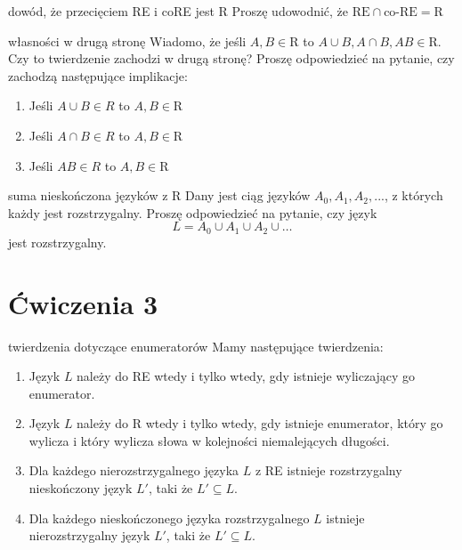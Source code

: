 \begin{exercise}{dowód, że przecięciem RE i coRE jest R}
    Proszę udowodnić, że $\text{RE} \cap \text{co-RE} = \text{R}$
\end{exercise}

\begin{exercise}{własności w drugą stronę}
    Wiadomo, że jeśli $A, B \in \text{R}$ to $A \cup B, A \cap B, AB \in \text{R}$. Czy to twierdzenie zachodzi w drugą stronę? Proszę odpowiedzieć na pytanie, czy zachodzą następujące implikacje:
\begin{enumerate}
    \item Jeśli $A \cup B \in R$ to $A,B \in \text{R}$
    \item Jeśli $A \cap B \in R$ to $A,B \in \text{R}$
    \item Jeśli $AB \in R$ to $A,B \in \text{R}$
\end{enumerate}
\end{exercise}
\begin{exercise}{suma nieskończona języków z R}
    Dany jest ciąg języków $A_0,A_1,A_2,...$, z których każdy jest rozstrzygalny. Proszę odpowiedzieć na pytanie, czy język
    $$L = A_0 \cup A_1 \cup A_2 \cup \dots$$
jest rozstrzygalny.
\end{exercise}

\section{Ćwiczenia 3}

\begin{exercise}{twierdzenia dotyczące enumeratorów}
    Mamy następujące twierdzenia:

\begin{enumerate}[label=\textbf{Tw.\ \Alph*.}, leftmargin=2cm]
  \item Język $L$ należy do RE wtedy i tylko wtedy, gdy istnieje wyliczający go enumerator.
  
  \item Język $L$ należy do R wtedy i tylko wtedy, gdy istnieje enumerator, który go wylicza i który wylicza słowa w kolejności niemalejących długości.
  
  \item Dla każdego nierozstrzygalnego języka $L$ z RE istnieje rozstrzygalny nieskończony język $L'$, taki że $L' \subseteq L$.
  
  \item Dla każdego nieskończonego języka rozstrzygalnego $L$ istnieje nierozstrzygalny język $L'$, taki że $L' \subseteq L$.
\end{enumerate}
\end{exercise}

